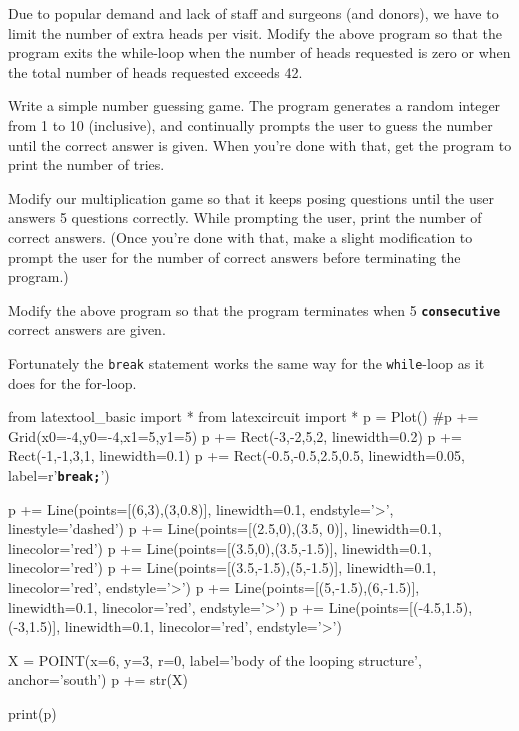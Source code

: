\begin{ex}
Due to popular demand and lack of staff and surgeons
(and donors), we have to limit the number of extra heads per visit.
Modify the above program so that the program exits the while-loop when
the number of heads requested is zero or when the total number of heads
requested exceeds 42.
\end{ex}
\begin{ex} Write a simple number guessing game. The program
generates a random integer from 1 to 10 (inclusive), and continually
prompts the user to guess the number until the correct answer is given.
When you're done with that, get the program to print the
number of tries.
\end{ex}
\begin{ex} Modify our multiplication game so that it keeps
posing questions until the user answers 5 questions correctly. While
prompting the user, print the number of correct answers. (Once
you're done with that, make a slight modification to
prompt the user for the number of correct answers before terminating the
program.)
\end{ex}
\begin{ex} Modify the above program so that the program
terminates when 5 \texttt{\textbf{consecutive}} correct answers are given.
\end{ex}
\newpage{}

Fortunately the \texttt{break} statement works the same way for the
\texttt{while}-loop as it does for the for-loop.
\begin{python}
from latextool_basic import *
from latexcircuit import *
p = Plot()
#p += Grid(x0=-4,y0=-4,x1=5,y1=5)
p += Rect(-3,-2,5,2, linewidth=0.2)
p += Rect(-1,-1,3,1, linewidth=0.1)
p += Rect(-0.5,-0.5,2.5,0.5, linewidth=0.05, label=r'\texttt{\textbf{break;}}')


p += Line(points=[(6,3),(3,0.8)], linewidth=0.1, endstyle='>', linestyle='dashed')
p += Line(points=[(2.5,0),(3.5, 0)], linewidth=0.1, linecolor='red')
p += Line(points=[(3.5,0),(3.5,-1.5)], linewidth=0.1, linecolor='red')
p += Line(points=[(3.5,-1.5),(5,-1.5)], linewidth=0.1, linecolor='red', endstyle='>')
p += Line(points=[(5,-1.5),(6,-1.5)], linewidth=0.1, linecolor='red', endstyle='>')
p += Line(points=[(-4.5,1.5),(-3,1.5)], linewidth=0.1, linecolor='red', endstyle='>')

X = POINT(x=6, y=3, r=0, label='body of the looping structure', anchor='south')
p += str(X)

print(p)
\end{python}


